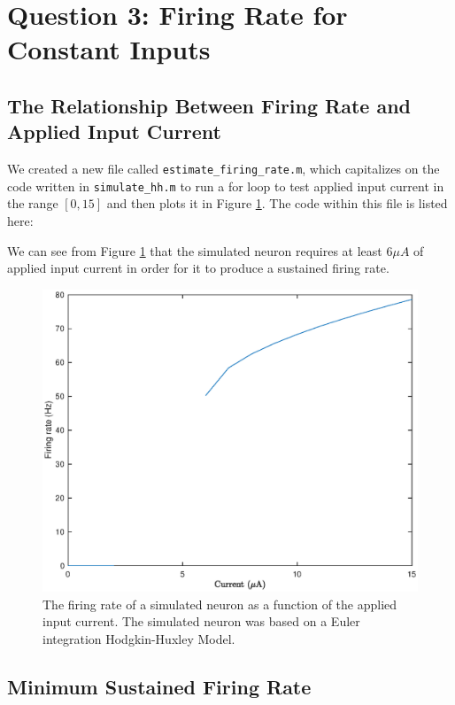 \documentclass[11pt, oneside]{article}
\begin{document}
\section{Question 3: Firing Rate for Constant Inputs}

\subsection{The Relationship Between Firing Rate and Applied Input Current}

We created a new file called \lstinline{estimate_firing_rate.m}, which capitalizes on the code written in \lstinline{simulate_hh.m} to run a for loop to test applied input current in the range $[0, 15]$ and then plots it in Figure \ref{fig:firing_rate}. The code within this file is listed here:


We can see from Figure \ref{fig:firing_rate} that the simulated neuron requires at least $6 \mu A$ of applied input current in order for it to produce a sustained firing rate.

\begin{figure}[ht!]
\centering
\includegraphics[width=1\textwidth]{firingrates.eps}
\caption{The firing rate of a simulated neuron as a function of the applied input current. The simulated neuron was based on a Euler integration Hodgkin-Huxley Model.}
\label{fig:firing_rate}
\end{figure}

\subsection{Minimum Sustained Firing Rate}
\end{document}
